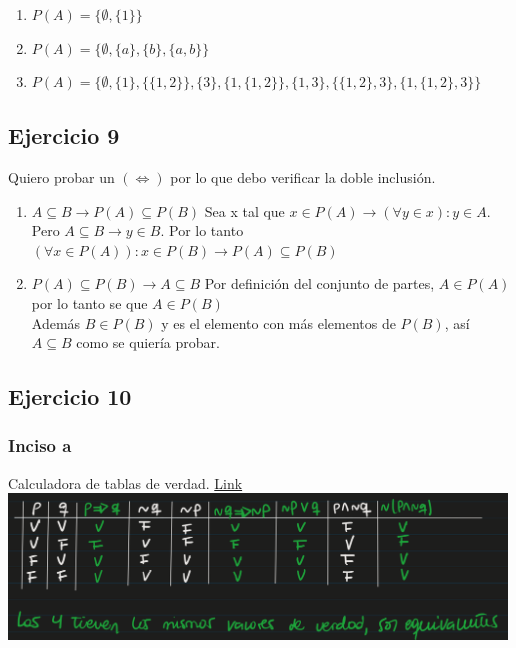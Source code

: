 \begin{enumerate}[label=(\alph*)]
    \item $P(A) = \{ \emptyset, \{ 1 \} \}$
    \item $P(A) = \{ \emptyset, \{ a \}, \{ b \}, \{ a, b \} \}$
    \item $P(A) = \{ \emptyset, \{ 1 \}, \{ \{ 1,2 \} \}, \{ 3 \}, \{ 1, \{1,2\} \}, \{ 1,3 \}, \{\{1,2\}, 3 \}, \{ 1,\{1,2\}, 3 \} \}$
\end{enumerate}

\subsection{Ejercicio 9}
Quiero probar un $(\iff)$ por lo que debo verificar la doble inclusión.

\begin{enumerate}[label=(\alph*)]
    \item $A \subseteq B \rightarrow P(A) \subseteq P(B)$ 
            Sea x tal que $x \in P(A) \rightarrow (\forall y \in x): y \in A$.\\
            Pero $A \subseteq B \rightarrow y \in B$.
            Por lo tanto $(\forall x \in P(A)): x \in P(B) \rightarrow P(A) \subseteq P(B)$
    \item $P(A) \subseteq P(B) \rightarrow A \subseteq B$ 
            Por definición del conjunto de partes, $A \in P(A)$ por lo tanto se que $A \in P(B)$ \\
            Además $B \in P(B)$ y es el elemento con más elementos de $P(B)$, así $A \subseteq B$ como se quiería probar.
\end{enumerate}

\subsection{Ejercicio 10}

\subsubsection{Inciso a}
Calculadora de tablas de verdad. \href{https://calculadorasonline.com/generador-de-tablas-de-verdad-logica-proposicional-algebra-booleana/}{Link}\\

\includegraphics[width=500px]{1.10}

